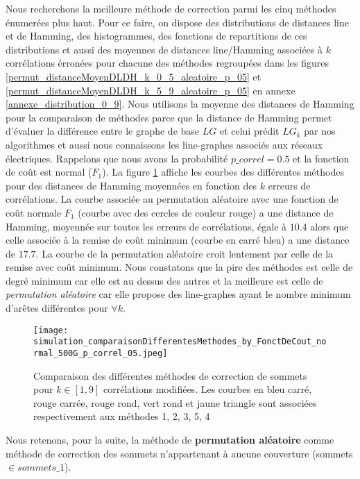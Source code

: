 Nous recherchons la meilleure m\'ethode de correction parmi les cinq m\'ethodes \'enumer\'ees plus haut. 
Pour ce faire, on dispose des distributions de distances line et de Hamming, des histogrammes, des fonctions de repartitions de ces distributions et aussi des moyennes de distances line/Hamming associ\'ees \`a $k$ corr\'elations \'erron\'ees pour chacune des m\'ethodes regroup\'ees dans les figures \ref{permut_distanceMoyenDLDH_k_0_5_aleatoire_p_05} et \ref{permut_distanceMoyenDLDH_k_5_9_aleatoire_p_05} en annexe \ref{annexe_distribution_0_9}.  
Nous utilisons la moyenne des distances de Hamming pour la comparaison de m\'ethodes parce que la distance de Hamming permet d'\'evaluer la diff\'erence entre le graphe de base $LG$ et celui pr\'edit $LG_k$ par nos algorithmes et aussi nous connaissons les line-graphes associ\'es aux r\'eseaux \'electriques.\newline
Rappelons que nous avons la probabilit\'e $p\_correl=0.5$ et la fonction de co\^ut est normal ($F_1$).
La figure \ref{compareDifferentesMethodesCorrectionSommets_fct_cout_normal_p05} affiche les courbes  des diff\'erentes m\'ethodes pour des distances de Hamming moyenn\'ees en fonction des $k$ erreurs de corr\'elations.
\newline
La courbe associ\'ee au permutation al\'eatoire avec une fonction de co\^ut normale $F_1$ (courbe avec des cercles de couleur rouge) a une distance de Hamming, moyenn\'ee sur toutes les erreurs de corr\'elations, \'egale \`a $10.4$ alors que celle associ\'ee \`a la remise de co\^ut minimum (courbe en carr\'e bleu) a une distance de $17.7$. La courbe de la permutation al\'eatoire croit lentement par celle de la remise avec  co\^ut minimum.
\newline
Nous constatons  que la pire des m\'ethodes est celle de degr\'e minimum car elle est au dessus des autres et la meilleure est celle de {\em permutation al\'eatoire}  car elle propose des line-graphes ayant  le nombre minimum d'ar\^etes diff\'erentes pour $ \forall k$.\newline
\begin{figure}[htb!] 
\centering
\texttt{[image: simulation\_comparaisonDifferentesMethodes\_by\_FonctDeCout\_normal\_500G\_p\_correl\_05.jpeg]}
\caption{ Comparaison des diff\'erentes m\'ethodes de correction de sommets pour $k \in [1,9]$ corr\'elations modifi\'ees. Les courbes en bleu carr\'e, rouge carr\'ee, rouge rond, vert rond et jaune triangle sont associ\'ees respectivement aux m\'ethodes 1, 2, 3, 5, 4 }
\label{compareDifferentesMethodesCorrectionSommets_fct_cout_normal_p05} 
\end{figure}
Nous retenons, pour la suite, la m\'ethode de {\bf permutation al\'eatoire} comme m\'ethode de correction des sommets n'appartenant \`a aucune couverture (sommets $\in sommets\_1$).